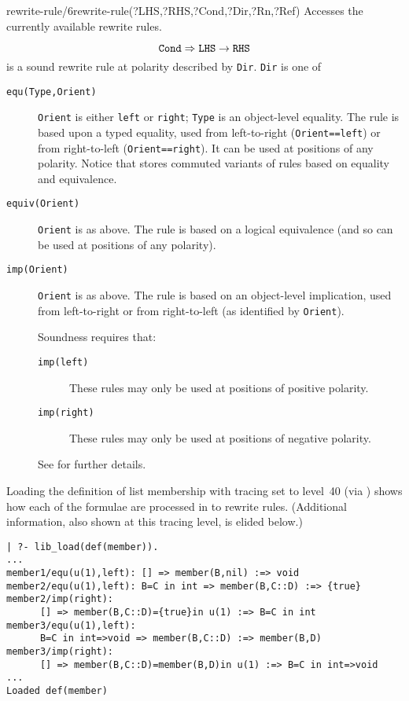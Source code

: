 \begin{predicate}{rewrite-rule/6}{rewrite-rule(?LHS,?RHS,?Cond,?Dir,?Rn,?Ref)}%
Accesses the currently available rewrite rules.  

\[
        {\tt Cond} \Rightarrow {\tt LHS}\rightarrow {\tt RHS}
\]
is a sound rewrite rule at polarity described by {\tt Dir}. {\tt Dir}
is one of
\begin{description}
\item [{\tt equ(Type,Orient)}] {\tt Orient} is either {\tt left} or
{\tt right}; {\tt Type} is an object-level equality.  The rule is
based upon a typed equality, used from left-to-right ({\tt Orient==left}) or
from right-to-left ({\tt Orient==right}).  It can be used at positions 
of any polarity.  Notice that \clam{} stores commuted 
variants of rules based on equality and equivalence.
\item [{\tt equiv(Orient)}] {\tt Orient} is as above. The rule is based on a logical equivalence (and so 
can be used at positions of any polarity).
\item [{\tt imp(Orient)}] {\tt Orient} is as above.  The rule is based 
on an object-level implication, used from left-to-right or from
right-to-left (as identified by {\tt Orient}).  

Soundness requires that:
\begin{description}
\item [{\tt imp(left)}] These rules may only be used at positions of
positive polarity.
\item [{\tt imp(right)}] These rules may only be used at positions of
negative polarity.
\end{description}
See  for further details.
\end{description}

\begin{example}
Loading the definition of list membership with tracing set to level~40 
(via ) shows how each of the formulae are processed in 
to rewrite rules.  (Additional information, also shown at this tracing 
level, is elided below.)
\begin{verbatim}
| ?- lib_load(def(member)).
...
member1/equ(u(1),left): [] => member(B,nil) :=> void
member2/equ(u(1),left): B=C in int => member(B,C::D) :=> {true}
member2/imp(right):
      [] => member(B,C::D)={true}in u(1) :=> B=C in int
member3/equ(u(1),left):
      B=C in int=>void => member(B,C::D) :=> member(B,D)
member3/imp(right):
      [] => member(B,C::D)=member(B,D)in u(1) :=> B=C in int=>void
...
Loaded def(member)


\end{verbatim}
\end{example}
\end{predicate}
